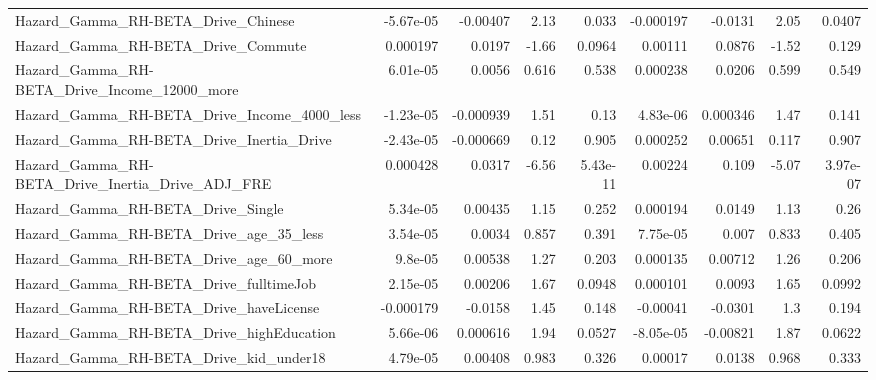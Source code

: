 \begin{tabular}{lrrrrrrrr}
Hazard\_Gamma\_RH-BETA\_Drive\_Chinese                 &   -5.67e-05 &     -0.00407 &     2.13 &    0.033 &  -0.000197 &     -0.0131 &         2.05 &        0.0407 \\
Hazard\_Gamma\_RH-BETA\_Drive\_Commute                 &    0.000197 &       0.0197 &    -1.66 &   0.0964 &    0.00111 &      0.0876 &        -1.52 &         0.129 \\
Hazard\_Gamma\_RH-BETA\_Drive\_Income\_12000\_more       &    6.01e-05 &       0.0056 &    0.616 &    0.538 &   0.000238 &      0.0206 &        0.599 &         0.549 \\
Hazard\_Gamma\_RH-BETA\_Drive\_Income\_4000\_less        &   -1.23e-05 &    -0.000939 &     1.51 &     0.13 &   4.83e-06 &    0.000346 &         1.47 &         0.141 \\
Hazard\_Gamma\_RH-BETA\_Drive\_Inertia\_Drive           &   -2.43e-05 &    -0.000669 &     0.12 &    0.905 &   0.000252 &     0.00651 &        0.117 &         0.907 \\
Hazard\_Gamma\_RH-BETA\_Drive\_Inertia\_Drive\_ADJ\_FRE   &    0.000428 &       0.0317 &    -6.56 & 5.43e-11 &    0.00224 &       0.109 &        -5.07 &      3.97e-07 \\
Hazard\_Gamma\_RH-BETA\_Drive\_Single                  &    5.34e-05 &      0.00435 &     1.15 &    0.252 &   0.000194 &      0.0149 &         1.13 &          0.26 \\
Hazard\_Gamma\_RH-BETA\_Drive\_age\_35\_less             &    3.54e-05 &       0.0034 &    0.857 &    0.391 &   7.75e-05 &       0.007 &        0.833 &         0.405 \\
Hazard\_Gamma\_RH-BETA\_Drive\_age\_60\_more             &     9.8e-05 &      0.00538 &     1.27 &    0.203 &   0.000135 &     0.00712 &         1.26 &         0.206 \\
Hazard\_Gamma\_RH-BETA\_Drive\_fulltimeJob             &    2.15e-05 &      0.00206 &     1.67 &   0.0948 &   0.000101 &      0.0093 &         1.65 &        0.0992 \\
Hazard\_Gamma\_RH-BETA\_Drive\_haveLicense             &   -0.000179 &      -0.0158 &     1.45 &    0.148 &   -0.00041 &     -0.0301 &          1.3 &         0.194 \\
Hazard\_Gamma\_RH-BETA\_Drive\_highEducation           &    5.66e-06 &     0.000616 &     1.94 &   0.0527 &  -8.05e-05 &    -0.00821 &         1.87 &        0.0622 \\
Hazard\_Gamma\_RH-BETA\_Drive\_kid\_under18             &    4.79e-05 &      0.00408 &    0.983 &    0.326 &    0.00017 &      0.0138 &        0.968 &         0.333 \\

\end{tabular}
